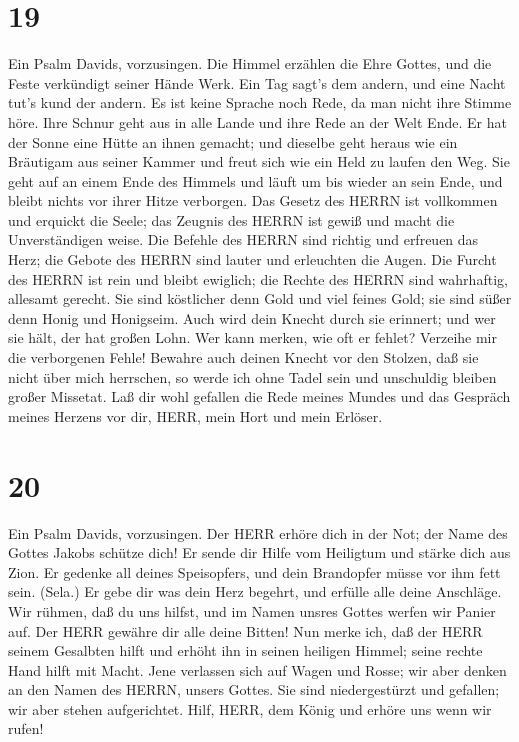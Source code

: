 \hypertarget{section-18}{%
\section{19}\label{section-18}}

 Ein Psalm Davids, vorzusingen. Die Himmel erzählen die Ehre
Gottes, und die Feste verkündigt seiner Hände Werk.  Ein Tag
sagt's dem andern, und eine Nacht tut's kund der andern.  Es
ist keine Sprache noch Rede, da man nicht ihre Stimme höre. 
Ihre Schnur geht aus in alle Lande und ihre Rede an der Welt Ende. Er
hat der Sonne eine Hütte an ihnen gemacht;  und dieselbe
geht heraus wie ein Bräutigam aus seiner Kammer und freut sich wie ein
Held zu laufen den Weg.  Sie geht auf an einem Ende des
Himmels und läuft um bis wieder an sein Ende, und bleibt nichts vor
ihrer Hitze verborgen.  Das Gesetz des HERRN ist vollkommen
und erquickt die Seele; das Zeugnis des HERRN ist gewiß und macht die
Unverständigen weise.  Die Befehle des HERRN sind richtig
und erfreuen das Herz; die Gebote des HERRN sind lauter und erleuchten
die Augen.  Die Furcht des HERRN ist rein und bleibt
ewiglich; die Rechte des HERRN sind wahrhaftig, allesamt gerecht.
 Sie sind köstlicher denn Gold und viel feines Gold; sie
sind süßer denn Honig und Honigseim.  Auch wird dein Knecht
durch sie erinnert; und wer sie hält, der hat großen Lohn. 
Wer kann merken, wie oft er fehlet? Verzeihe mir die verborgenen Fehle!
 Bewahre auch deinen Knecht vor den Stolzen, daß sie nicht
über mich herrschen, so werde ich ohne Tadel sein und unschuldig bleiben
großer Missetat.  Laß dir wohl gefallen die Rede meines
Mundes und das Gespräch meines Herzens vor dir, HERR, mein Hort und mein
Erlöser.

\hypertarget{section-19}{%
\section{20}\label{section-19}}

 Ein Psalm Davids, vorzusingen. Der HERR erhöre dich in der
Not; der Name des Gottes Jakobs schütze dich!  Er sende dir
Hilfe vom Heiligtum und stärke dich aus Zion.  Er gedenke
all deines Speisopfers, und dein Brandopfer müsse vor ihm fett sein.
(Sela.)  Er gebe dir was dein Herz begehrt, und erfülle alle
deine Anschläge.  Wir rühmen, daß du uns hilfst, und im
Namen unsres Gottes werfen wir Panier auf. Der HERR gewähre dir alle
deine Bitten!  Nun merke ich, daß der HERR seinem Gesalbten
hilft und erhöht ihn in seinen heiligen Himmel; seine rechte Hand hilft
mit Macht.  Jene verlassen sich auf Wagen und Rosse; wir
aber denken an den Namen des HERRN, unsers Gottes.  Sie sind
niedergestürzt und gefallen; wir aber stehen aufgerichtet. 
Hilf, HERR, dem König und erhöre uns wenn wir rufen!

